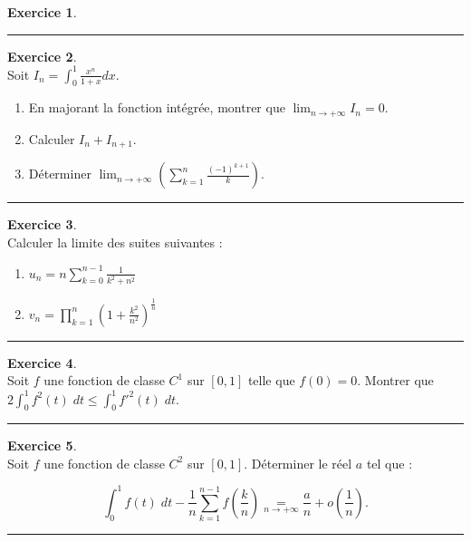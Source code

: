 \documentclass[a4paper,10pt]{article}
\theoremstyle{definition}
\theoremstyle{definition}
\newtheorem{exo}{Exercice}
\begin{document}
\begin{minipage}{1\linewidth}
\begin{minipage}[t]{0.48\linewidth}
\begin{exo}
			\centering
			\rule{1\linewidth}{0.6pt}
		\end{exo}
	
	\end{minipage}	
	\hfill\vrule\hfill
	\begin{minipage}[t]{0.48\linewidth}
		\raggedright
		
		\begin{exo}\quad\\[0.25cm]
		Soit $\displaystyle I_{n} = \int_0^1 \frac{x^n}{1 + x}d x$.
		\begin{enumerate}
			\item En majorant la fonction int\'egr\'ee, montrer que
			$\lim_{n\to +\infty} I_{n}=0$.
			\item  Calculer $I_n + I_{n + 1}$.
			\item D\'eterminer $\displaystyle \lim_{n \rightarrow  + \infty} \left(\sum_{k = 1}^n \frac{
				(-1)^{k + 1}}k\right)$.
		\end{enumerate}
			
			\centering
			\rule{1\linewidth}{0.6pt}
		\end{exo}
		
		
	
	\begin{exo}\quad\\
		Calculer la limite des suites suivantes :
		\begin{enumerate}
			\item $\displaystyle u_n=n\sum_{k=0}^{n-1}\frac 1{k^2+n^2}$
			\item $\displaystyle v_n=\prod\limits_{k=1}^n\left(1+\frac{k^2}{n^2}\right) ^{\frac 1n}$
		\end{enumerate}
		
		\centering
		\rule{1\linewidth}{0.6pt}
	\end{exo}

	\begin{exo}\quad\\
	Soit $f$ une fonction de classe $C^1$ sur $[0,1]$ telle que $f(0)=0$. Montrer que $2\int_{0}^{1}f^2(t)\;dt\leq\int_{0}^{1}{f'}^2(t)\;dt$.
	
	\centering
	\rule{1\linewidth}{0.6pt}
\end{exo}

	\begin{exo}\quad\\
		Soit $f$ une fonction de classe $C^2$ sur $[0,1]$. Déterminer le réel $a$ tel que :
		
		$$\int_{0}^{1}f(t)\;dt-\frac{1}{n}\sum_{k=1}^{n-1}f(\frac{k}{n})\underset{n\rightarrow+\infty}{=}\frac{a}{n}+o(\frac{1}{n}).$$
		
		\centering
		\rule{1\linewidth}{0.6pt}
	\end{exo}


		
	
		
		
	\end{minipage}
\end{minipage}
\end{document}
